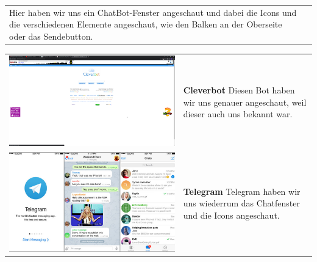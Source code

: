 \begin{tabular}{C{6cm}  L{7cm}}
        Hier haben wir uns ein ChatBot-Fenster angeschaut und dabei die Icons und die 
        verschiedenen Elemente angeschaut, wie den Balken an der Oberseite oder das Sendebutton. 
    \end{tabular}

    \begin{tabular}{C{6cm}  L{7cm}}
        \includegraphics[width=\linewidth]{bilder/research pic/cleverbot.png} & \textbf{Cleverbot} \newline 
        Diesen Bot haben wir uns genauer angeschaut, weil dieser auch uns bekannt war.
        \\
        \includegraphics[width=\linewidth]{bilder/research pic/Telegram pic.png} & \textbf{Telegram} \newline 
        Telegram haben wir uns wiederrum das Chatfenster und die Icons angeschaut.
        \\

\end{tabular}
